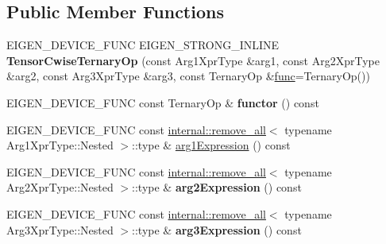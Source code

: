 \subsection*{Public Member Functions}
\begin{DoxyCompactItemize}
\item 
\mbox{\label{class_eigen_1_1_tensor_cwise_ternary_op_a2d0bbb3f1a0c80e53b0db2bdbcb382ed}} 
E\+I\+G\+E\+N\+\_\+\+D\+E\+V\+I\+C\+E\+\_\+\+F\+U\+NC E\+I\+G\+E\+N\+\_\+\+S\+T\+R\+O\+N\+G\+\_\+\+I\+N\+L\+I\+NE {\bfseries Tensor\+Cwise\+Ternary\+Op} (const Arg1\+Xpr\+Type \&arg1, const Arg2\+Xpr\+Type \&arg2, const Arg3\+Xpr\+Type \&arg3, const Ternary\+Op \&\hyperlink{structfunc}{func}=Ternary\+Op())
\item 
\mbox{\label{class_eigen_1_1_tensor_cwise_ternary_op_a92b579cf1d2f0e50da90d74da3ca171a}} 
E\+I\+G\+E\+N\+\_\+\+D\+E\+V\+I\+C\+E\+\_\+\+F\+U\+NC const Ternary\+Op \& {\bfseries functor} () const
\item 
E\+I\+G\+E\+N\+\_\+\+D\+E\+V\+I\+C\+E\+\_\+\+F\+U\+NC const \hyperlink{struct_eigen_1_1internal_1_1remove__all}{internal\+::remove\+\_\+all}$<$ typename Arg1\+Xpr\+Type\+::\+Nested $>$\+::type \& \hyperlink{class_eigen_1_1_tensor_cwise_ternary_op_a6e797469eff84e6b24dab5bf5f2c1da8}{arg1\+Expression} () const
\item 
\mbox{\label{class_eigen_1_1_tensor_cwise_ternary_op_a0126952332ec91c521b1302430c8c078}} 
E\+I\+G\+E\+N\+\_\+\+D\+E\+V\+I\+C\+E\+\_\+\+F\+U\+NC const \hyperlink{struct_eigen_1_1internal_1_1remove__all}{internal\+::remove\+\_\+all}$<$ typename Arg2\+Xpr\+Type\+::\+Nested $>$\+::type \& {\bfseries arg2\+Expression} () const
\item 
\mbox{\label{class_eigen_1_1_tensor_cwise_ternary_op_af61803afff8cef7bfac41435e6f90913}} 
E\+I\+G\+E\+N\+\_\+\+D\+E\+V\+I\+C\+E\+\_\+\+F\+U\+NC const \hyperlink{struct_eigen_1_1internal_1_1remove__all}{internal\+::remove\+\_\+all}$<$ typename Arg3\+Xpr\+Type\+::\+Nested $>$\+::type \& {\bfseries arg3\+Expression} () const
\item 
\mbox{\label{class_eigen_1_1_tensor_cwise_ternary_op_a2d0bbb3f1a0c80e53b0db2bdbcb382ed}} 

\end{DoxyCompactItemize}
